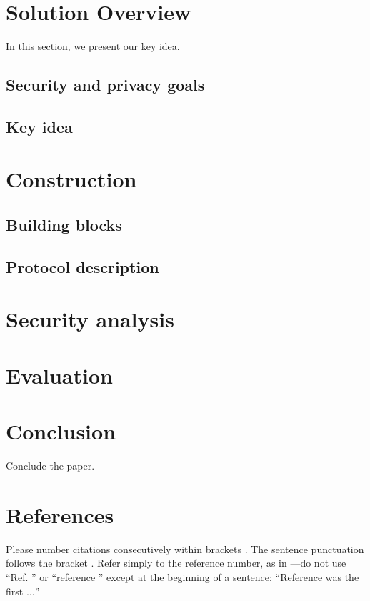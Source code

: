 \documentclass[conference]{IEEEtran}
\begin{document}
\section{Solution Overview}
In this section, we present our key idea.

\subsection{Security and privacy goals}

\subsection{Key idea}

\section{Construction}

\subsection{Building blocks}

\subsection{Protocol description}

\section{Security analysis}

\section{Evaluation}

\section{Conclusion}
Conclude the paper.

\section*{References}

Please number citations consecutively within brackets \cite{b1}. The 
sentence punctuation follows the bracket \cite{b2}. Refer simply to the reference 
number, as in \cite{b3}---do not use ``Ref. \cite{b3}'' or ``reference \cite{b3}'' except at 
the beginning of a sentence: ``Reference \cite{b3} was the first $\ldots$''
\end{document}
